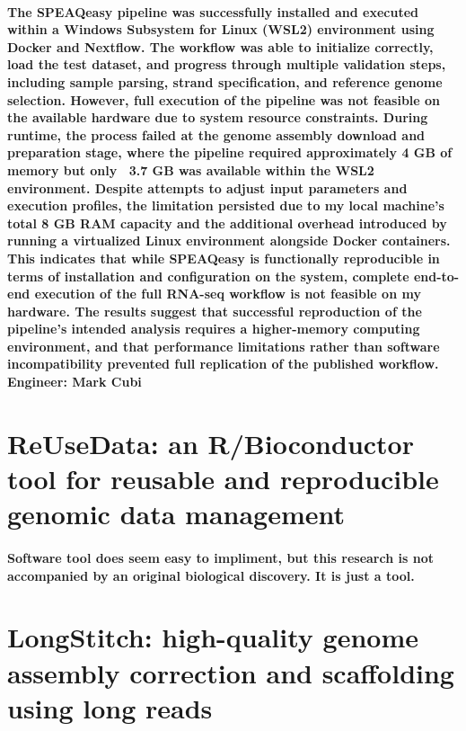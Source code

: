 \documentclass{article}
\begin{document}
\paragraph{
    The SPEAQeasy pipeline was successfully installed and executed within a Windows Subsystem for Linux (WSL2) environment using Docker and Nextflow. The workflow was able to initialize correctly, load the test dataset, and progress through multiple validation steps, including sample parsing, strand specification, and reference genome selection. However, full execution of the pipeline was not feasible on the available hardware due to system resource constraints. During runtime, the process failed at the genome assembly download and preparation stage, where the pipeline required approximately 4 GB of memory but only ~3.7 GB was available within the WSL2 environment. Despite attempts to adjust input parameters and execution profiles, the limitation persisted due to my local machine's total 8 GB RAM capacity and the additional overhead introduced by running a virtualized Linux environment alongside Docker containers. This indicates that while SPEAQeasy is functionally reproducible in terms of installation and configuration on the system, complete end-to-end execution of the full RNA-seq workflow is not feasible on my hardware. The results suggest that successful reproduction of the pipeline’s intended analysis requires a higher-memory computing environment, and that performance limitations rather than software incompatibility prevented full replication of the published workflow. Engineer: Mark Cubi
}

\section{ReUseData: an R/Bioconductor tool for reusable and reproducible genomic data management \cite{Liu2024ReUseData}}

\paragraph{
    Software tool does seem easy to impliment, but this research is not accompanied by an original biological discovery. It is just a tool.
}

\section{LongStitch: high-quality genome assembly correction and scaffolding using long reads \cite{Coombe2021LongStitch}}
\end{document}
